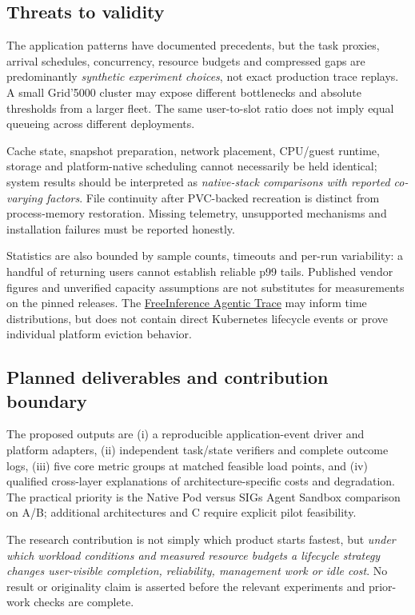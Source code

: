 \documentclass[
  a4paper,
]{article}
\begin{document}
\subsection{Threats to validity}
The application patterns
have documented precedents,
but the task proxies,
arrival schedules,
concurrency, resource
budgets and compressed
gaps are predominantly
\emph{synthetic experiment
choices}, not exact
production trace replays.
A small Grid'5000
cluster may expose
different bottlenecks
and absolute thresholds
from a larger fleet.
The same user-to-slot
ratio does not imply
equal queueing across
different deployments.

Cache state, snapshot
preparation, network
placement, CPU/guest
runtime, storage and
platform-native scheduling
cannot necessarily be
held identical; system
results should be
interpreted as
\emph{native-stack
comparisons with reported
co-varying factors}.
File continuity after
PVC-backed recreation
is distinct from
process-memory restoration.
Missing telemetry,
unsupported mechanisms
and installation failures
must be reported honestly.

Statistics are also
bounded by sample
counts, timeouts and
per-run variability:
a handful of returning
users cannot establish
reliable p99 tails.
Published vendor
figures and unverified
capacity assumptions
are not substitutes
for measurements on
the pinned releases.
The \href{https://github.com/HarvardMadSys/freeinference_agentic_trace}
{FreeInference Agentic Trace}
may inform time
distributions, but
does not contain
direct Kubernetes
lifecycle events
or prove individual
platform eviction
behavior.

\subsection{Planned deliverables and contribution boundary}
The proposed outputs
are (i) a reproducible
application-event driver
and platform adapters,
(ii) independent
task/state verifiers
and complete outcome
logs, (iii) five
core metric groups
at matched feasible
load points, and
(iv) qualified
cross-layer explanations
of architecture-specific
costs and degradation.
The practical priority
is the Native Pod
versus SIGs Agent
Sandbox comparison
on A/B; additional
architectures and C
require explicit
pilot feasibility.

The research contribution
is not simply which
product starts fastest,
but \emph{under which
workload conditions
and measured resource
budgets a lifecycle
strategy changes
user-visible completion,
reliability, management
work or idle cost}.
No result or
originality claim
is asserted before
the relevant experiments
and prior-work checks
are complete.
\end{document}
